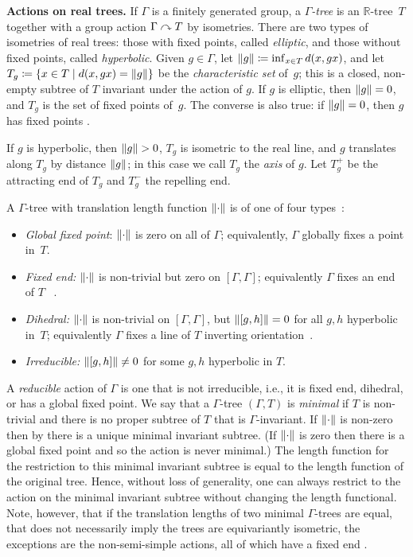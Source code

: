 \textbf{Actions on real trees.} If $\Gamma$ is a finitely generated
group, a
\emph{$\Gamma$-tree} is an $\mathbb{R}$-tree~$T$ together with a group
action $\Gamma \curvearrowright T$ by isometries.
There are two types of isometries of real trees: those with fixed
points, called \emph{elliptic}, and those without fixed points, called
\emph{hyperbolic}.
Given $g\in \Gamma$, let $\lVert g\rVert\coloneqq\inf_{x \in T} d(x,gx)$, and
let $T_g \coloneqq \{ x\in T \mid d(x,gx)=\lVert g\rVert \}$ be the
\emph{characteristic set} of~$g$; this is a closed, non-empty subtree
of $T$ invariant under the action of $g$.
If $g$ is elliptic, then $\lVert g \rVert =0$, and $T_g$ is the
set of fixed points of~$g$. The converse is also true: if $\lVert g\rVert =
0$, then $g$ has fixed points \cite[1.3]{CM87:GroupActions}.

If $g$ is hyperbolic, then $\lVert g \rVert >0$, $T_g$ is isometric to the
real line, and $g$ translates along $T_g$ by distance $\lVert g\rVert$; in this
case we call $T_g$ the \emph{axis} of $g$.
Let $T_g^+$ be the attracting end of $T_g$ and $T_g^-$ the repelling end.


A $\Gamma$-tree with  translation length function
$\lVert \cdot \rVert$ is of one of four
types~\cite[pp.\ 572 and 583]{CM87:GroupActions}:
\begin{itemize}
\item \textit{Global fixed point}: $\lVert \cdot \rVert$ is zero on all of
  $\Gamma$; equivalently,  $\Gamma$ globally fixes a point in~$T$.
\item \textit{Fixed end:} $\lVert \cdot \rVert$ is non-trivial but zero on $[\Gamma,\Gamma]$;
  equivalently $\Gamma$ fixes an end of $T$ ~\cite[Theorem~2.2,
  Corollary~2.3]{CM87:GroupActions}.
\item \textit{Dihedral:} $\lVert \cdot \rVert$ is non-trivial on $[\Gamma,\Gamma]$, but
  $\lVert[g,h]\rVert=0$ for all $g,h$ hyperbolic in~$T$; equivalently
  $\Gamma$ fixes a line of $T$ inverting
  orientation~\cite[Theorem~2.5]{CM87:GroupActions}.
\item \textit{Irreducible:} $\lVert[g,h]\rVert \neq 0$ for some $g,h$ hyperbolic in $T$.
\end{itemize}
A \emph{reducible} action of $\Gamma$ is one that is not irreducible,
i.e., it is fixed end, dihedral, or has a global fixed point. 
We say that a $\Gamma$-tree $(\Gamma,T)$ is \emph{minimal} if $T$ is
non-trivial and there is no proper subtree of $T$ that is $\Gamma$-invariant.
If $\lVert\cdot\rVert$ is non-zero then by
\cite[Proposition~3.1]{CM87:GroupActions} there is a
unique minimal invariant subtree.
(If $\lVert\cdot\rVert$ is zero then there
is a global fixed point and so the action is never minimal.)
The length function for the
restriction to this minimal invariant subtree is equal to the length
function of the original tree. Hence, without loss of generality, one
can always restrict to the action on the minimal invariant subtree
without changing the length functional. Note, however, that if the
translation lengths of two minimal $\Gamma$-trees are
equal, that does not necessarily imply the trees are equivariantly
isometric, the exceptions are the non-semi-simple actions, all of which have a fixed end \cite[Theorem 3.7 and \S 2]{CM87:GroupActions}. 

